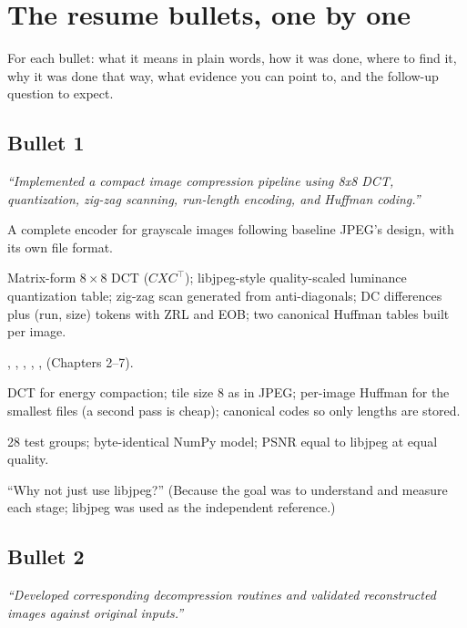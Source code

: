 \chapter{The resume bullets, one by one}\label{ch:resume}

For each bullet: what it means in plain words, how it was done, where to find it, why it was done that way, what evidence you can point to, and the follow-up question to expect.

\section{Bullet 1}
\textit{``Implemented a compact image compression pipeline using 8x8 DCT, quantization, zig-zag scanning, run-length encoding, and Huffman coding.''}

\begin{description}[leftmargin=2.2cm,style=nextline]
\item[What] A complete encoder for grayscale images following baseline JPEG's design, with its own file format.
\item[How] Matrix-form $8\times8$ DCT ($CXC^{\top}$); libjpeg-style quality-scaled luminance quantization table; zig-zag scan generated from anti-diagonals; DC differences plus (run, size) tokens with ZRL and EOB; two canonical Huffman tables built per image.
\item[Where] , , , , ,  (Chapters 2--7).
\item[Why these choices] DCT for energy compaction; tile size 8 as in JPEG; per-image Huffman for the smallest files (a second pass is cheap); canonical codes so only lengths are stored.
\item[Evidence] 28 test groups; byte-identical NumPy model; PSNR equal to libjpeg at equal quality.
\item[Expect] ``Why not just use libjpeg?'' (Because the goal was to understand and measure each stage; libjpeg was used as the independent reference.)
\end{description}

\section{Bullet 2}
\textit{``Developed corresponding decompression routines and validated reconstructed images against original inputs.''}

